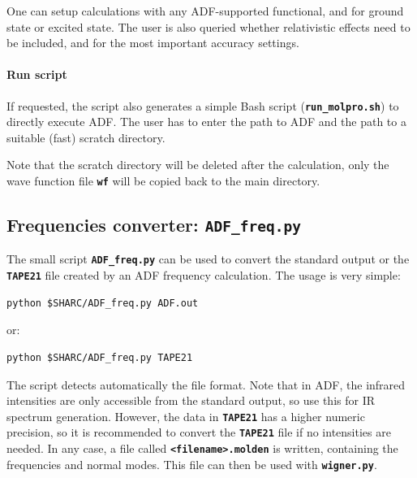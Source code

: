\documentclass[a4paper,10pt,DIV=15,openany,twoside=false]{scrbook}
\newcommand{\ttt}[1]{\textbf{\texttt{#1}}}
\newenvironment{example}{
  \setlength{\OuterFrameSep}{3pt}
  \vspace{0mm}
  \definecolor{shadecolor}{HTML}{E4F4FF}
  \begin{shaded}
}{
  \end{shaded}
}
\begin{document}
One can setup calculations with any ADF-supported functional, and for ground state or excited state. The user is also queried whether relativistic effects need to be included, and for the most important accuracy settings.

\paragraph{Run script}

If requested, the script also generates a simple Bash script (\ttt{run\_molpro.sh}) to directly execute ADF. The user has to enter the path to ADF and the path to a suitable (fast) scratch directory. 

Note that the scratch directory will be deleted after the calculation, only the wave function file \ttt{wf} will be copied back to the main directory.



\subsection{Frequencies converter: \ttt{ADF\_freq.py}}\label{sec:ADF_freq.py}

The small script \ttt{ADF\_freq.py} can be used to convert the standard output or the \ttt{TAPE21} file created by an ADF frequency calculation.
The usage is very simple:
\begin{example}
  \begin{verbatim}
python $SHARC/ADF_freq.py ADF.out
\end{verbatim}
\end{example}
or:
\begin{example}
  \begin{verbatim}
python $SHARC/ADF_freq.py TAPE21
\end{verbatim}
\end{example}
The script detects automatically the file format.
Note that in ADF, the infrared intensities are only accessible from the standard output, so use this for IR spectrum generation.
However, the data in \ttt{TAPE21} has a higher numeric precision, so it is recommended to convert the \ttt{TAPE21} file if no intensities are needed.
In any case, a file called \ttt{<filename>.molden} is written, containing the frequencies and normal modes.
This file can then be used with \ttt{wigner.py}.


\end{document}
